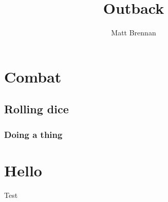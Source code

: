 \documentclass[10pt, a4paper, twocolumn]{book}
\title{Outback}
\author{Matt Brennan}
\date{}
\begin{document}
\frontmatter
{\let\cleardoublepage\clearpage
\maketitle
\tableofcontents
}

\mainmatter
\chapter{Combat}
\lipsum[1]

\section{Rolling dice}
\lipsum[1]
\subsection{Doing a thing}
\lipsum

\chapter{Hello}
Test
\end{document}
